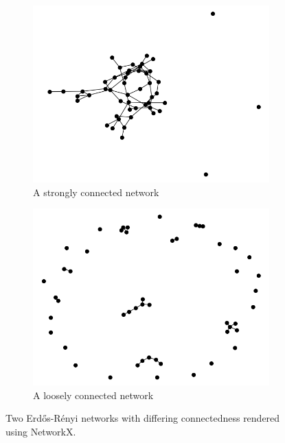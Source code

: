 \begin{figure}
    \begin{center}
        \begin{subfigure}[b]{0.45\textwidth}
            \includegraphics[width=\textwidth]{img/2/high_prob}
            \caption{A strongly connected network}
            \label{fig:strongly_connected_network}
        \end{subfigure}
        \begin{subfigure}[b]{0.45\textwidth}
            \includegraphics[width=\textwidth]{img/2/low_prob}
            \caption{A loosely connected network}
            \label{fig:loosely_connected_network}
        \end{subfigure}
    \end{center}
    \caption{Two Erd\H{o}s-R\'{e}nyi\cite{erdos59a}  networks with differing connectedness rendered using NetworkX\cite{SciPyProceedings_11}.}
    \label{fig:connectivity_strengths}
\end{figure}

